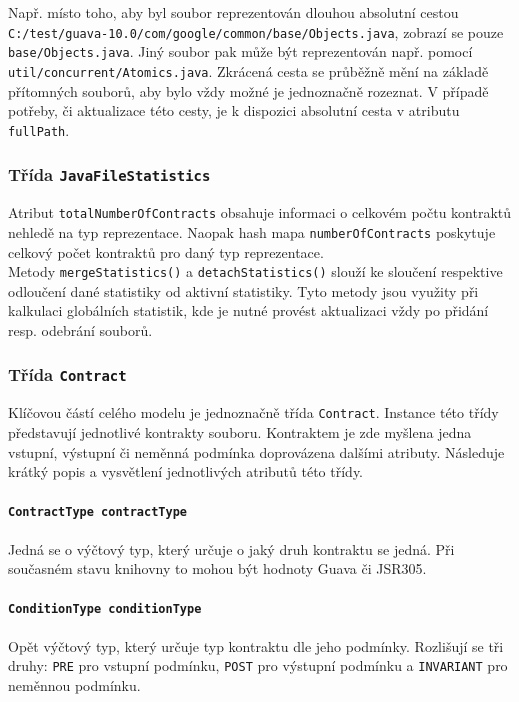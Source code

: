 					Např. místo toho, aby byl soubor reprezentován dlouhou absolutní cestou \texttt{C:/test/guava-10.0/com/google/common/base/Objects.java}, zobrazí se pouze \texttt{base/Objects.java}. Jiný soubor pak může být reprezentován např. pomocí \texttt{util/concurrent/Atomics.java}. Zkrácená cesta se průběžně mění na základě přítomných souborů, aby bylo vždy možné je jednoznačně rozeznat. V případě potřeby, či aktualizace této cesty, je k dispozici absolutní cesta v atributu \texttt{fullPath}.
				
				\subsubsection{Třída \texttt{JavaFileStatistics}} 
					Atribut \texttt{totalNumberOfContracts} obsahuje informaci o celkovém počtu kontraktů nehledě na typ reprezentace. Naopak hash mapa \texttt{numberOfContracts} poskytuje celkový počet kontraktů pro daný typ reprezentace.\\
				
				Metody \texttt{mergeStatistics()} a \texttt{detachStatistics()} slouží ke sloučení respektive odloučení dané statistiky od aktivní statistiky. Tyto metody jsou využity při kalkulaci globálních statistik, kde je nutné provést aktualizaci vždy po přidání resp. odebrání souborů.
					
				
				\subsubsection{Třída \texttt{Contract}}	
					Klíčovou částí celého modelu je jednoznačně třída \texttt{Contract}. Instance této třídy představují jednotlivé kontrakty souboru. Kontraktem je zde myšlena jedna vstupní, výstupní či neměnná podmínka doprovázena dalšími atributy. Následuje krátký popis a vysvětlení jednotlivých atributů této třídy.
					
					\paragraph{\texttt{ContractType contractType}} 
						Jedná se o výčtový typ, který určuje o jaký druh kontraktu se jedná. Při současném stavu knihovny to mohou být hodnoty Guava či JSR305.
			
					\paragraph{\texttt{ConditionType conditionType}} 
						Opět výčtový typ, který určuje typ kontraktu dle jeho podmínky. Rozlišují se tři druhy: \texttt{PRE} pro vstupní podmínku, \texttt{POST} pro výstupní podmínku a \texttt{INVARIANT} pro neměnnou podmínku.
			
